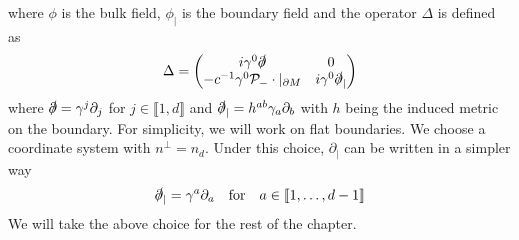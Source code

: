 where $\phi$ is the bulk field, $\phi_|$ is the boundary field and the operator $\Delta$ is defined as
\begin{equation}\label{wen-hamiltonian}
\Delta = \begin{pmatrix}
i \gamma^0 \slashed{\partial}  & 0 \\
-c^{-1} \gamma^0 \mathcal{P}_- \cdot \vert_{\partial M}&  i\gamma^0 \slashed{\partial}_|
\end{pmatrix}
\end{equation}
where $\slashed{\partial} = \gamma^j\partial_j$ for
$j \in \llbracket 1 , d \rrbracket$ and $\slashed{\partial}_| = h^{ab} \gamma_{a} \partial_{b}$ with $h$ being the induced metric on the boundary.
For simplicity, we will work on flat boundaries.
We choose a coordinate system with $n^\perp = n_d$.
Under this choice,
$\partial_|$ can be written in a simpler way
\begin{equation*}
\slashed \partial_| = \gamma^a\partial_a \quad\mathrm{for}\quad 
a \in \llbracket 1, \ldots, d-1 \rrbracket
\end{equation*}
We will take the above choice for the rest of the chapter. 





